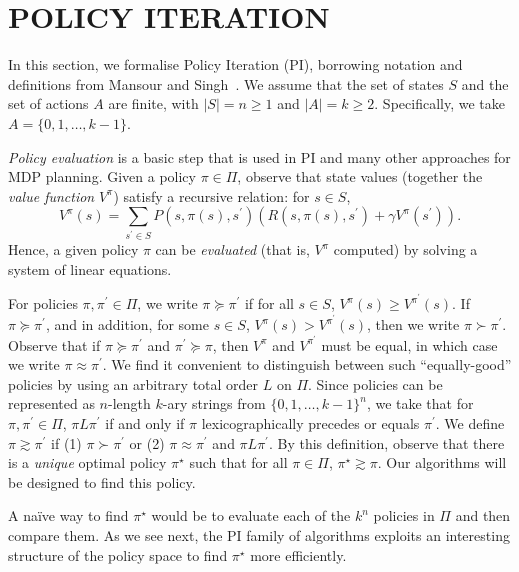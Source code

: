 \section{POLICY ITERATION}
\label{sec:policy_iteration}

In this section, we formalise Policy Iteration (PI), borrowing notation and definitions from Mansour and Singh~. We assume that the set of states $S$ and the set of actions $A$ are finite, with $|S| = n \geq 1$ and $|A| = k \geq 2$. Specifically, we take $A = \{0, 1, \dots, k - 1\}$.

\textit{Policy evaluation} is a basic step that is used in PI and many other approaches for MDP planning. Given a policy $\pi \in \Pi$, observe that state values (together the \textit{value function} $V^{\pi}$) satisfy a recursive relation: for $s \in S$,  $$V^{\pi}(s) = \sum_{s^{\prime} \in S} P(s, \pi(s), s^{\prime}) (R(s, \pi(s), s^{\prime}) + \gamma V^{\pi}(s^{\prime})).$$ Hence, a given policy $\pi$ can be \textit{evaluated} (that is, $V^{\pi}$ computed) by solving a system of linear equations.

For policies $\pi, \pi^{\prime} \in \Pi$, we write $\pi \succeq \pi^{\prime}$ if for all $s \in S$, $V^{\pi}(s) \geq V^{\pi^{\prime}}(s).$ If $\pi \succeq \pi^{\prime}$, and in addition, for some $s \in S$, $V^{\pi}(s) > V^{\pi^{\prime}}(s)$, then we write $\pi \succ \pi^{\prime}$. Observe that if $\pi \succeq \pi^{\prime}$ and $\pi^{\prime} \succeq \pi$, then $V^{\pi}$ and $V^{\pi^{\prime}}$ must be equal, in which case we write $\pi \approx \pi^{\prime}$. We find it convenient to distinguish between such ``equally-good'' policies by using an arbitrary total order $L$ on $\Pi$. Since policies can be represented as $n$-length $k$-ary strings from $\{0, 1, \dots, k - 1\}^{n}$, we take that for $\pi, \pi^{\prime} \in \Pi$, $\pi L \pi^{\prime}$ if and only if $\pi$ lexicographically precedes or equals $\pi^{\prime}$. We define $\pi \gtrsim \pi^{\prime}$ if (1) $\pi \succ \pi^{\prime}$ or (2) $\pi \approx \pi^{\prime}$ and $\pi L \pi^{\prime}$. By this definition, observe that there is a \textit{unique} optimal policy $\pi^{\star}$ such that for all $\pi \in \Pi$, $\pi^{\star} \gtrsim \pi$. Our algorithms will be designed to find this policy.

A na\"{i}ve way to find $\pi^{\star}$ would be to evaluate each of the $k^{n}$ policies in $\Pi$ and then compare them. As we see next, the PI family of algorithms exploits an interesting structure of the policy space to find $\pi^{\star}$ more efficiently.

